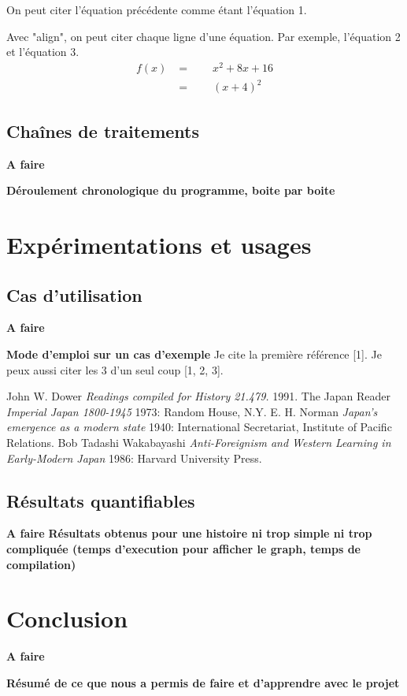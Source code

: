 \documentclass[12pt]{article}
\begin{document}
On peut citer l'équation précédente comme étant l'équation 1.
\newline

Avec "align", on peut citer chaque ligne d'une équation. Par exemple,
\newline
l'équation 2 et l'équation 3.
\begin{align}
f(x) &=\qquad x^2 + 8x + 16 \\
	 &=\qquad (x+4)^2 
\end{align}
\subsection{Chaînes de traitements}
\textbf{A faire}

\textbf{Déroulement chronologique du programme, boite par boite}
\section{Expérimentations et usages}
\subsection{Cas d'utilisation}
\textbf{A faire}

\textbf{Mode d'emploi sur un cas d'exemple}
Je cite la première référence [1]. Je peux aussi citer les 3 d'un seul coup
[1, 2, 3].
\begin{thebibliography}{1}
 John W. Dower {\em Readings compiled for History 21.479.} 1991.
 The Japan Reader {\em Imperial Japan 1800-1945} 1973: Random House, N.Y.
 E. H. Norman {\em Japan's emergence as a modern state} 1940: International Secretariat, Institute of Pacific Relations.
 Bob Tadashi Wakabayashi {\em Anti-Foreignism and Western Learning in Early-Modern Japan} 1986: Harvard University Press.
\end{thebibliography}
\subsection{Résultats quantifiables}
\textbf{A faire}
\textbf{Résultats obtenus pour une histoire ni trop simple ni trop compliquée (temps d'execution pour afficher le graph, temps de compilation)}
\section{Conclusion}
\textbf{A faire}

\textbf{Résumé de ce que nous a permis de faire et d'apprendre avec le projet}
\end{document}
